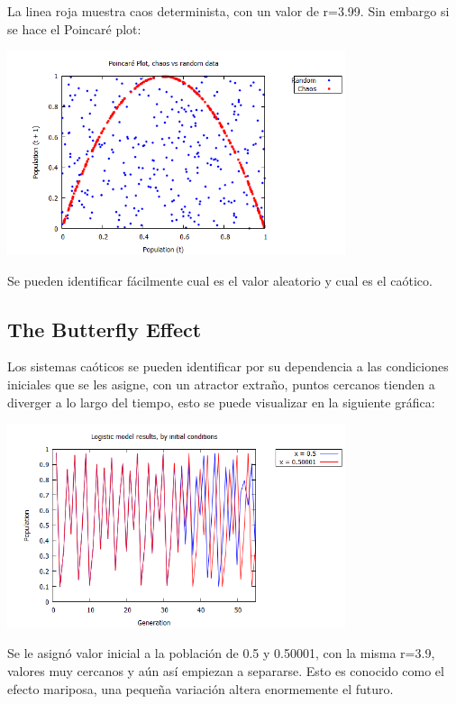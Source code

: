 \documentclass[12pt]{article}
\begin{document}
La linea roja muestra caos determinista, con un valor de r=3.99. Sin embargo si se hace el Poincaré plot:

\begin{center}
 \includegraphics[height=6cm]{11.png}
 \end{center}

Se pueden identificar fácilmente cual es el valor aleatorio y cual es el caótico. 

\subsection{The Butterfly Effect}

Los sistemas caóticos se pueden identificar por su dependencia a las condiciones iniciales que se les asigne, con un atractor extraño, puntos cercanos tienden a diverger a lo largo del tiempo, esto se puede visualizar en la siguiente gráfica:

\begin{center}
 \includegraphics[height=6cm]{12.png}
 \end{center}

Se le asignó valor inicial a la población de 0.5 y 0.50001, con la misma r=3.9, valores muy cercanos y aún así empiezan a separarse.  Esto es conocido como el efecto mariposa, una pequeña variación altera enormemente el futuro.
\end{document}
